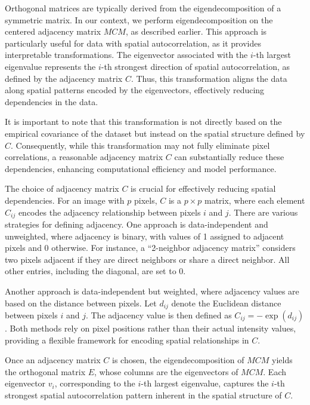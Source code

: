 \documentclass[12pt]{article}
\begin{document}
Orthogonal matrices are typically derived from the eigendecomposition of a symmetric matrix. In our context, we perform eigendecomposition on the centered adjacency matrix \( MCM \), as described earlier. This approach is particularly useful for data with spatial autocorrelation, as it provides interpretable transformations. The eigenvector associated with the \( i \)-th largest eigenvalue represents the \( i \)-th strongest direction of spatial autocorrelation, as defined by the adjacency matrix \( C \). Thus, this transformation aligns the data along spatial patterns encoded by the eigenvectors, effectively reducing dependencies in the data.

It is important to note that this transformation is not directly based on the empirical covariance of the dataset but instead on the spatial structure defined by \( C \). Consequently, while this transformation may not fully eliminate pixel correlations, a reasonable adjacency matrix \( C \) can substantially reduce these dependencies, enhancing computational efficiency and model performance.

The choice of adjacency matrix \( C \) is crucial for effectively reducing spatial dependencies. For an image with \( p \) pixels, \( C \) is a \( p \times p \) matrix, where each element \( C_{ij} \) encodes the adjacency relationship between pixels \( i \) and \( j \). There are various strategies for defining adjacency. One approach is data-independent and unweighted, where adjacency is binary, with values of 1 assigned to adjacent pixels and 0 otherwise. For instance, a ``2-neighbor adjacency matrix'' considers two pixels adjacent if they are direct neighbors or share a direct neighbor. All other entries, including the diagonal, are set to 0. 

Another approach is data-independent but weighted, where adjacency values are based on the distance between pixels. Let \( d_{ij} \) denote the Euclidean distance between pixels \( i \) and \( j \). The adjacency value is then defined as \( C_{ij} = -\exp(d_{ij}) \). Both methods rely on pixel positions rather than their actual intensity values, providing a flexible framework for encoding spatial relationships in \( C \).

Once an adjacency matrix \( C \) is chosen, the eigendecomposition of \( MCM \) yields the orthogonal matrix \( E \), whose columns are the eigenvectors of \( MCM \). Each eigenvector \( v_i \), corresponding to the \( i \)-th largest eigenvalue, captures the \( i \)-th strongest spatial autocorrelation pattern inherent in the spatial structure of \( C \).
\end{document}
